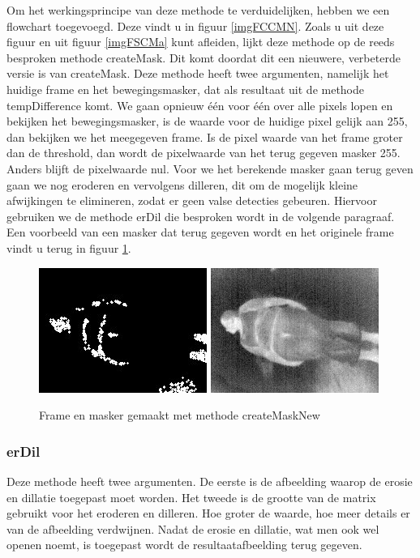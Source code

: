 Om het werkingsprincipe van deze methode te verduidelijken, hebben we een flowchart toegevoegd. Deze vindt u in figuur \ref{imgFCCMN}. Zoals u uit deze figuur en uit figuur \ref{imgFSCMa} kunt afleiden, lijkt deze methode op de reeds besproken methode createMask. Dit komt doordat dit een nieuwere, verbeterde versie is van createMask. Deze methode heeft twee argumenten, namelijk het huidige frame en het bewegingsmasker, dat als resultaat uit de methode tempDifference komt. We gaan opnieuw \'e\'en voor \'e\'en over alle pixels lopen en bekijken het bewegingsmasker, is de waarde voor de huidige pixel gelijk aan 255, dan bekijken we het meegegeven frame. Is de pixel waarde van het frame groter dan de threshold, dan wordt de pixelwaarde van het terug gegeven masker 255. Anders blijft de pixelwaarde nul. Voor we het berekende masker gaan terug geven gaan we nog eroderen en vervolgens dilleren, dit om de mogelijk kleine afwijkingen te elimineren, zodat er geen valse detecties gebeuren. Hiervoor gebruiken we de methode erDil die besproken wordt in de volgende paragraaf. Een voorbeeld van een masker dat terug gegeven wordt en het originele frame vindt u terug in figuur \ref{imgCMN}.
\begin{figure}[hbp]
	\includegraphics[scale=0.65]{MaskMetDif}
	\includegraphics[scale=0.65]{ImgMetDif}
	\caption{Frame en masker gemaakt met methode createMaskNew}
	\label{imgCMN}
\end{figure} 
 
 \subsubsection{erDil}
Deze methode heeft twee argumenten. De eerste is de afbeelding waarop de erosie en dillatie toegepast moet worden. Het tweede is de grootte van de matrix gebruikt voor het eroderen en dilleren. Hoe groter de waarde, hoe meer details er van de afbeelding verdwijnen. Nadat de erosie en dillatie, wat men ook wel openen noemt, is toegepast wordt de resultaatafbeelding terug gegeven. 
 

